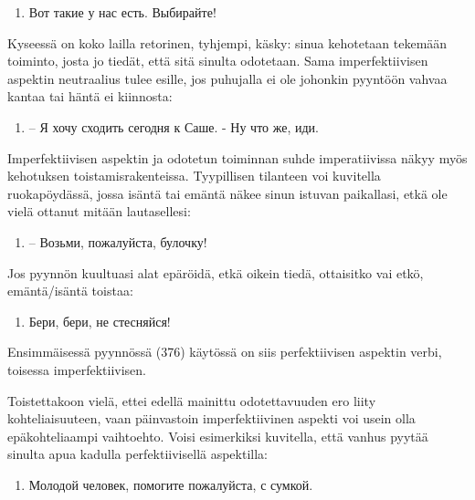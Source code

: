 \documentclass[]{scrreprt}
\providecommand{\tightlist}{%
  \setlength{\itemsep}{0pt}\setlength{\parskip}{0pt}}
\begin{document}
\begin{enumerate}
\def\labelenumi{(\arabic{enumi})}
\setcounter{enumi}{373}
\tightlist
\item Вот такие у нас есть. Выбирайте!
\end{enumerate}

Kyseessä on koko lailla retorinen, tyhjempi, käsky: sinua kehotetaan
tekemään toiminto, josta jo tiedät, että sitä sinulta odotetaan. Sama
imperfektiivisen aspektin neutraalius tulee esille, jos puhujalla ei ole
johonkin pyyntöön vahvaa kantaa tai häntä ei kiinnosta:

\begin{enumerate}
\def\labelenumi{(\arabic{enumi})}
\setcounter{enumi}{374}
\tightlist
\item
  -- Я хочу сходить сегодня к Саше. - Ну что же, {иди.}
\end{enumerate}

Imperfektiivisen aspektin ja odotetun toiminnan suhde imperatiivissa
näkyy myös kehotuksen toistamisrakenteissa. Tyypillisen tilanteen voi
kuvitella ruokapöydässä, jossa isäntä tai emäntä näkee sinun istuvan
paikallasi, etkä ole vielä ottanut mitään lautasellesi:

\begin{enumerate}
\def\labelenumi{(\arabic{enumi})}
\setcounter{enumi}{375}
\tightlist
\item
  -- Возьми, пожалуйста, булочку!
\end{enumerate}

Jos pyynnön kuultuasi alat epäröidä, etkä oikein tiedä, ottaisitko vai
etkö, emäntä/isäntä toistaa:

\begin{enumerate}
\def\labelenumi{(\arabic{enumi})}
\setcounter{enumi}{376}
\tightlist
\item
  Бери, бери, не стесняйся!
\end{enumerate}

Ensimmäisessä pyynnössä (376) käytössä on siis perfektiivisen aspektin
verbi, toisessa imperfektiivisen.

Toistettakoon vielä, ettei edellä mainittu odotettavuuden ero liity
kohteliaisuuteen, vaan päinvastoin imperfektiivinen aspekti voi usein
olla epäkohteliaampi vaihtoehto. Voisi esimerkiksi kuvitella, että
vanhus pyytää sinulta apua kadulla perfektiivisellä aspektilla:

\begin{enumerate}
\def\labelenumi{(\arabic{enumi})}
\setcounter{enumi}{377}
\tightlist
\item
  Молодой человек, помогите пожалуйста, с сумкой.
\end{enumerate}
\end{document}

